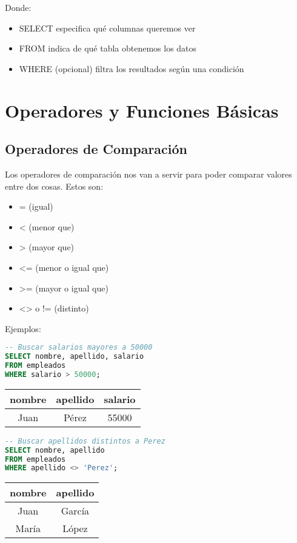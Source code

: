 \documentclass[12pt]{article}
\begin{document}
Donde:
\begin{itemize}
    \item SELECT especifica qué columnas queremos ver
    \item FROM indica de qué tabla obtenemos los datos
    \item WHERE (opcional) filtra los resultados según una condición
\end{itemize}

\section{Operadores y Funciones Básicas}
\subsection{Operadores de Comparación}
Los operadores de comparación nos van a servir para poder comparar valores entre dos cosas. Estos son:
\begin{itemize}
    \item = (igual)
    \item < (menor que)
    \item > (mayor que)
    \item <= (menor o igual que)
    \item >= (mayor o igual que)
    \item <> o != (distinto)
\end{itemize}

\vspace{1em}

Ejemplos:
\begin{lstlisting}[language=SQL]
-- Buscar salarios mayores a 50000
SELECT nombre, apellido, salario
FROM empleados
WHERE salario > 50000;
\end{lstlisting}

\begin{center}
\begin{tabular}{ccc}
\toprule
nombre & apellido & salario \\
\midrule
Juan & Pérez & 55000 \\
\bottomrule
\end{tabular}
\end{center}

\begin{lstlisting}[language=SQL]
-- Buscar apellidos distintos a Perez
SELECT nombre, apellido
FROM empleados
WHERE apellido <> 'Perez';
\end{lstlisting}

\begin{center}
\begin{tabular}{cc}
\toprule
nombre & apellido \\
\midrule
Juan & García \\
María & López \\
\bottomrule
\end{tabular}
\end{center}
\end{document}
